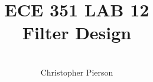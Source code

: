 



\documentclass[12pt]{article}

\usepackage[english]{babel}
\usepackage[utf8x]{inputenc}
\usepackage[T1]{fontenc}
\usepackage{graphicx}
\usepackage{amsmath}
\usepackage{caption}
\usepackage{float}
\usepackage{caption}
\usepackage{subcaption}
\usepackage{rotating}
\usepackage{setspace}

\usepackage[a4paper,top=3cm,bottom=2cm,left=3cm,right=3cm,marginparwidth=1.75cm]{geometry}

\usepackage[colorinlistoftodos]{todonotes}
\usepackage[colorlinks=true, allcolors=blue]{hyperref}
\usepackage{listings}
\usepackage{gensymb}
\usepackage{ mathrsfs }



\title{%
	\textbf{ ECE 351 LAB 12} \\
Filter Design 
	 }

\author{\\
	Christopher Pierson}

	
	
\vspace{\fill}
\maketitle
\vspace{\fill}
\clearpage

\tableofcontents

